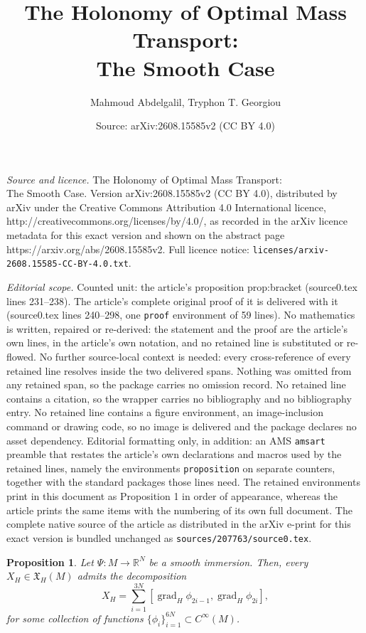 \documentclass[10pt,a4paper]{amsart}
\title{The Holonomy of Optimal Mass Transport:\\ The Smooth Case}
\author{Mahmoud Abdelgalil, Tryphon T. Georgiou}
\date{Source: arXiv:2608.15585v2 (CC BY 4.0)}
\newtheorem{proposition}{Proposition}
\newcommand{\Cinf}{C^{\infty}(\M)}
\newcommand{\M}{M}
\newcommand{\XH}{\mathfrak{X}_H(\M)}
\DeclareMathOperator{\grad}{\mathrm{grad}}
\begin{document}
\maketitle

\noindent\emph{Source and licence.} The Holonomy of Optimal Mass Transport:\\ The Smooth Case. Version arXiv:2608.15585v2 (CC BY 4.0), distributed by arXiv under the Creative Commons Attribution 4.0 International licence, http://creativecommons.org/licenses/by/4.0/, as recorded in the arXiv licence metadata for this exact version and shown on the abstract page https://arxiv.org/abs/2608.15585v2. Full licence notice: \texttt{licenses/arxiv-2608.15585-CC-BY-4.0.txt}.\par\smallskip

\noindent\textit{Editorial scope.} Counted unit: the article's proposition prop:bracket (source0.tex lines 231--238). The article's complete original proof of it is delivered with it (source0.tex lines 240--298, one \texttt{proof} environment of 59 lines). No mathematics is written, repaired or re-derived: the statement and the proof are the article's own lines, in the article's own notation, and no retained line is substituted or re-flowed.  No further source-local context is needed: every cross-reference of every retained line resolves inside the two delivered spans.  Nothing was omitted from any retained span, so the package carries no omission record.  No retained line contains a citation, so the wrapper carries no bibliography and no bibliography entry.  No retained line contains a figure environment, an image-inclusion command or drawing code, so no image is delivered and the package declares no asset dependency.  Editorial formatting only, in addition: an AMS \texttt{amsart} preamble that restates the article's own declarations and macros used by the retained lines, namely the environments \texttt{proposition} on separate counters, together with the standard packages those lines need.  The retained environments print in this document as Proposition 1 in order of appearance, whereas the article prints the same items with the numbering of its own full document.  The complete native source of the article as distributed in the arXiv e-print for this exact version is bundled unchanged as \texttt{sources/207763/source0.tex}.
\begin{proposition}\label{prop:bracket} Let $\Psi:\M\rightarrow\mathbb{R}^{N}$ be a smooth immersion. Then, every $X_H\in \XH$ admits the decomposition
%
$$
X_H = \sum_{i=1}^{3N} [\grad_H\phi_{2i-1}, \grad_H\phi_{2i}],
$$
%
for some collection of functions $\{\phi_i\}_{i=1}^{6N} \subset \Cinf$.
\end{proposition}
\end{document}

